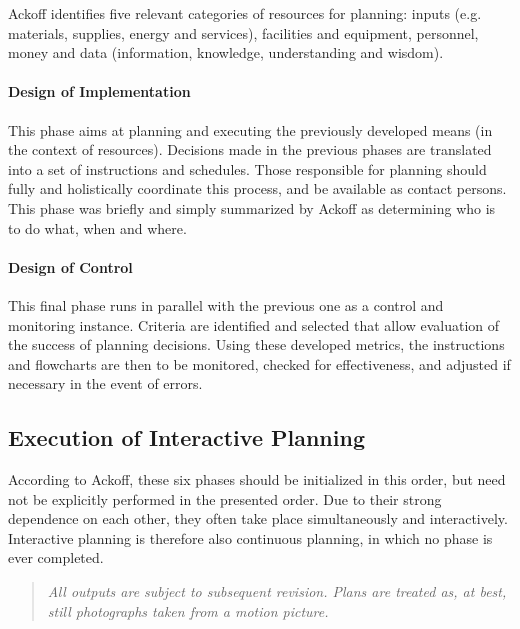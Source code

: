 \documentclass[
a4paper,
12pt
]{scrartcl}
\begin{document}
    Ackoff identifies five relevant categories of resources for planning: inputs (e.g. materials, supplies, energy and services), facilities and equipment, personnel, money and data (information, knowledge, understanding and wisdom).\cite{ackoff:2001} 
    
    
		
	\paragraph{Design of Implementation} 
	
	This phase aims at planning and executing the previously developed means (in the context of resources). Decisions made in the previous phases are translated into a set of instructions and schedules. Those responsible for planning should fully and holistically coordinate this process, and be available as contact persons. This phase was briefly and simply summarized by Ackoff as \glqq
	determining who is to do what, when and where.\grqq \cite{ackoff:2001}
	
	
   \paragraph{Design of Control} 
   
	This final phase runs in parallel with the previous one as a control and monitoring instance. Criteria are identified and selected that allow evaluation of the success of planning decisions. Using these developed metrics, the instructions and flowcharts are then to be monitored, checked for effectiveness, and adjusted if necessary in the event of errors.
	
	
    \subsection{Execution of Interactive Planning}
	
	According to Ackoff, these six phases should be initialized in this order, but need not be explicitly performed in the presented order. Due to their strong dependence on each other, they often take place simultaneously and interactively. Interactive planning is therefore also continuous planning, in which no phase is ever completed.	
	
		\begin{quote}\itshape{\glqq
		All outputs are subject to subsequent revision. Plans are treated as, at best, still photographs taken from a motion picture.\grqq } \cite{ackoff:2001}
\end{quote}	
	
\end{document}
